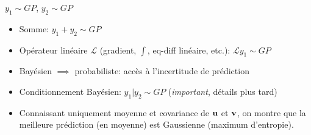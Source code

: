 \documentclass[xcolor=svgnames, t]{beamer}
\newcommand{\coloredemph}[1]{\textcolor{internationalblue}{\emph{#1}}}
\newcommand{\vectorx}[1]{\boldsymbol{\MakeLowercase{\mathbf{#1}}}}
\begin{document}
\begin{frame}
  \frametitle{\secname}
$y_1 \sim GP$, $y_2 \sim GP$
\begin{itemize}
  \pause
  \item Somme: $y_1 + y_2 \sim GP$
  \pause
  \item Opérateur linéaire $\mathcal{L}$ (gradient, $\int$, eq-diff linéaire, etc.):
  $\mathcal{L}y_1 \sim GP$
  \item Bayésien $\implies$ probabiliste: accès à l'incertitude de prédiction
  \pause
  \item Conditionnement Bayésien: $y_1 | y_2 \sim GP$ (\coloredemph{important}, détails plus tard)
  \pause
  \item Connaissant uniquement moyenne et covariance de $\vectorx{u}$ et $\vectorx{v}$,
  on montre que la meilleure prédiction (en moyenne) est Gaussienne (maximum d'entropie).
\end{itemize}
\end{frame}

\end{document}
